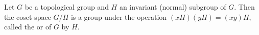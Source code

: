 Let $G$ be a topological group and $H$ an invariant (normal) subgroup of $G$. Then the coset space $G/H$ is a group under the operation $(xH)(yH) = (xy)H$, called the  or  of $G$ by $H$.
